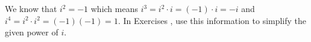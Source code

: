 {\noindent We know that $i^{2} = -1$ which means $i^{3} = i^{2} \cdot i = (-1) \cdot i = -i$ and $i^{4} = i^{2} \cdot i^{2} = (-1)(-1) = 1$. In Exercises}
{, use this information to simplify the given power of $i$.}
\begin{multicols}{2}
\end{multicols}